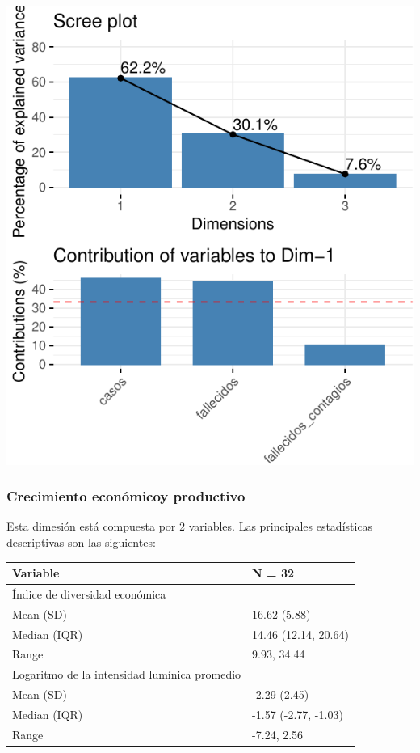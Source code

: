 \includegraphics{Anexo_PCA_files/figure-latex/unnamed-chunk-1-1.pdf}

\hypertarget{crecimiento-econuxf3micoy-productivo}{%
\subsubsection{Crecimiento económicoy
productivo}\label{crecimiento-econuxf3micoy-productivo}}

Esta dimesión está compuesta por 2 variables. Las principales
estadísticas descriptivas son las siguientes:

\begin{table}
\centering\begingroup\fontsize{7}{9}\selectfont

\begin{tabular}{ll}
\toprule
Variable & N = 32\\
\midrule
Índice de diversidad económica & \\
\hspace{1em}Mean (SD) & 16.62 (5.88)\\
\hspace{1em}Median (IQR) & 14.46 (12.14, 20.64)\\
\hspace{1em}Range & 9.93, 34.44\\
Logaritmo de la intensidad lumínica promedio & \\
\addlinespace
\hspace{1em}Mean (SD) & -2.29 (2.45)\\
\hspace{1em}Median (IQR) & -1.57 (-2.77, -1.03)\\
\hspace{1em}Range & -7.24, 2.56\\
\bottomrule
\end{tabular}
\endgroup{}
\end{table}

